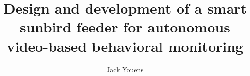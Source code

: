 







\makeatletter
\title{Design and development of a smart sunbird feeder for autonomous video-based behavioral monitoring}\let\Title\@title
\author{Jack Youens}            \let\Author\@author
\makeatother


\beforepreface

   

